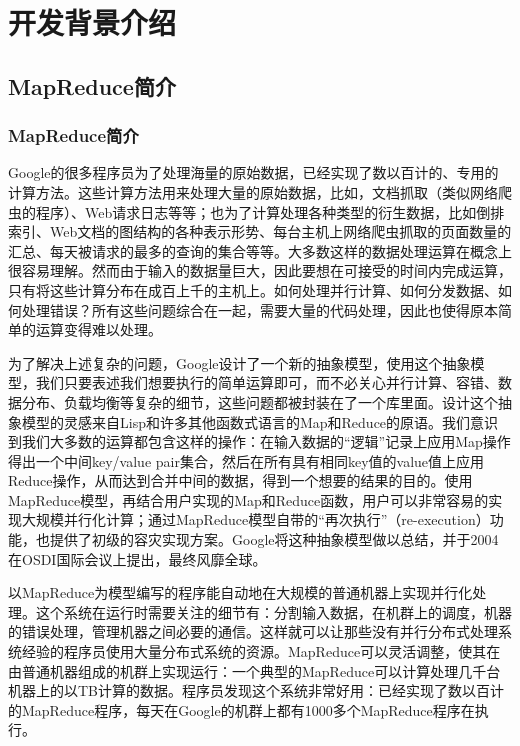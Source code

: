 \chapter{开发背景介绍}
\label{chap:2}

\section[MapReduce简介]{MapReduce简介\cite{paper:Google-MapReduce}}
\subsection{MapReduce简介}
Google的很多程序员为了处理海量的原始数据，已经实现了数以百计的、专用的计算方法。这些计算方法用来处理大量的原始数据，比如，文档抓取（类似网络爬虫的程序）、Web请求日志等等；也为了计算处理各种类型的衍生数据，比如倒排索引、Web文档的图结构的各种表示形势、每台主机上网络爬虫抓取的页面数量的汇总、每天被请求的最多的查询的集合等等。大多数这样的数据处理运算在概念上很容易理解。然而由于输入的数据量巨大，因此要想在可接受的时间内完成运算，只有将这些计算分布在成百上千的主机上。如何处理并行计算、如何分发数据、如何处理错误？所有这些问题综合在一起，需要大量的代码处理，因此也使得原本简单的运算变得难以处理。

为了解决上述复杂的问题，Google设计了一个新的抽象模型，使用这个抽象模型，我们只要表述我们想要执行的简单运算即可，而不必关心并行计算、容错、数据分布、负载均衡等复杂的细节，这些问题都被封装在了一个库里面。设计这个抽象模型的灵感来自Lisp和许多其他函数式语言的Map和Reduce的原语。我们意识到我们大多数的运算都包含这样的操作：在输入数据的“逻辑”记录上应用Map操作得出一个中间key/value pair集合，然后在所有具有相同key值的value值上应用Reduce操作，从而达到合并中间的数据，得到一个想要的结果的目的。使用MapReduce模型，再结合用户实现的Map和Reduce函数，用户可以非常容易的实现大规模并行化计算；通过MapReduce模型自带的“再次执行”（re-execution）功能，也提供了初级的容灾实现方案。Google将这种抽象模型做以总结，并于2004在OSDI国际会议上提出\cite{paper:Google-MapReduce}，最终风靡全球。

以MapReduce为模型编写的程序能自动地在大规模的普通机器上实现并行化处理。这个系统在运行时需要关注的细节有：分割输入数据，在机群上的调度，机器的错误处理，管理机器之间必要的通信。这样就可以让那些没有并行分布式处理系统经验的程序员使用大量分布式系统的资源。MapReduce可以灵活调整，使其在由普通机器组成的机群上实现运行：一个典型的MapReduce可以计算处理几千台机器上的以TB计算的数据。程序员发现这个系统非常好用：已经实现了数以百计的MapReduce程序，每天在Google的机群上都有1000多个MapReduce程序在执行。

